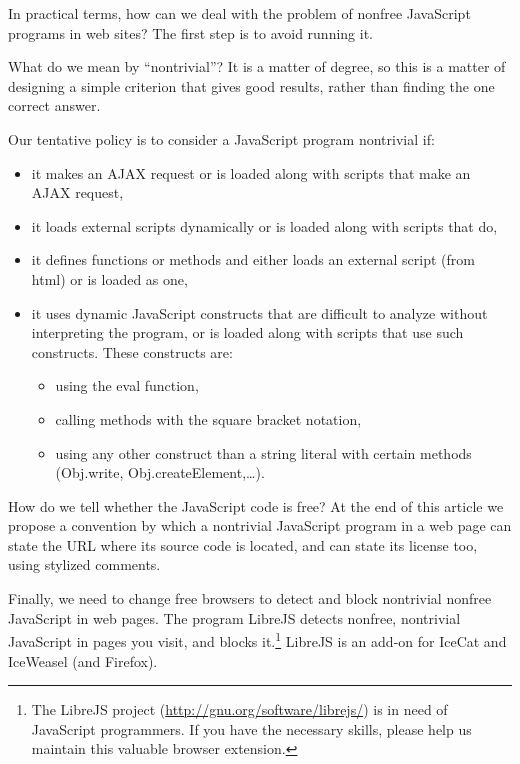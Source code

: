 In practical terms, how can we deal with the problem of nonfree
JavaScript programs in web sites?  The first step is to avoid running
it.

What do we mean by ``nontrivial''?  It is a matter of degree, so this
is a matter of designing a simple criterion that gives good results,
rather than finding the one correct answer.

Our tentative policy is to consider a JavaScript program nontrivial
if:

\begin{itemize} %
\item
it makes an AJAX request or is loaded along with scripts that make an
AJAX request,
\item
it loads external scripts dynamically or is loaded along with scripts
that do,
\item
it defines functions or methods and either loads an external script
(from html) or is loaded as one,
\item
it uses dynamic JavaScript constructs that are difficult to analyze
without interpreting the program, or is loaded along with scripts that
use such constructs.  These constructs are:

\jstrap

\begin{itemize} %
\item
using the eval function,
\item
calling methods with the square bracket notation,
\item
using any other construct than a string literal with certain methods
(Obj.write, Obj.createElement,\dots{}).
\end{itemize}
\end{itemize}

How do we tell whether the JavaScript code is free?  At the end of
this article we propose a convention by which a nontrivial JavaScript
program in a web page can state the URL where its source code is
located, and can state its license too, using stylized comments.

Finally, we need to change free browsers to detect and block
nontrivial nonfree JavaScript in web pages.  The program LibreJS
detects nonfree, nontrivial JavaScript in pages you visit, and blocks
it.\footnote{%

The LibreJS project (\url{http://gnu.org/software/librejs/}) is in need of JavaScript programmers.  If you have the necessary skills, please help us maintain this valuable browser extension.
} LibreJS is an add-on for IceCat and IceWeasel (and Firefox).

